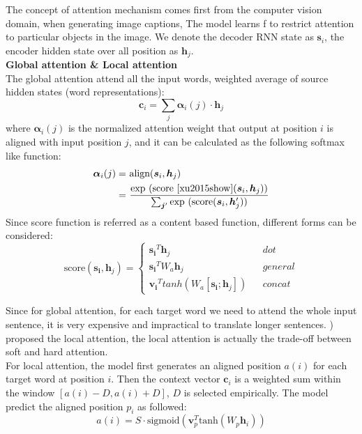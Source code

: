 %
The concept of attention mechanism comes first from the computer vision domain, when generating image captions,  The model learns f to restrict attention to particular objects in the image.
We denote the decoder RNN state as $\bm{s}_i$, the encoder hidden state over all position as $\bm{h}_j$.\\

\textbf{Global attention \& Local attention } \\
The global attention attend all the input words, weighted average of source hidden states (word representations):
\[ \bm{c}_i = \sum_{j} \bm{\alpha}_i(j)\cdot  \bm{h}_j \]
where $\bm{\alpha}_i(j)$ is the normalized attention weight that output at position $i$ is aligned with input position $j$, and it can be calculated as the following softmax like function:
\begin{align}
\bm{\alpha}_i(j) = & \ \text{align}(\bm{s}_i, {\bm{h}}_j) \\
= & \ \frac{\text{exp\ }(\text{score \cite{xu2015show}}(\bm{s}_i, {\bm{h}}_j))}{\sum_{\bm{j}^{\prime}} \text{exp\ }(\text{score}(\bm{s}_i, {\bm{h}}_j^{\prime}))}
\end{align}
Since score function is referred as a content based function, different forms can be considered:
\begin{equation}
\text{score}(\bm{s_i}, {\bm{h}}_j)=\left\{
\begin{array}{lcl}
{\bm{s_i}}^T {\bm{h}}_j & & dot\\
{\bm{s_i}}^T W_a {\bm{h}}_j & & general\\
{\bm{v_i}}^T tanh(W_a[\bm{s_i}; {\bm{h}}_j]) & & concat
\end{array} \right.
\end{equation}



Since for global attention, for each target word we need to attend the whole input sentence, it is very expensive and impractical to translate longer sentences. \cite{luong2015effective}) proposed the local attention, the local attention is actually the  trade-off between soft and hard attention. \\
For local attention, the model first generates an aligned position ${a(i)}$ for each target word at position $i$. Then the context vector ${\bm{c}_i}$ is a weighted sum within the window ${[a(i)-D, a(i)+D]}$, ${D}$ is selected empirically. The model predict the aligned  position ${p_i}$ as followed:
\[ a(i) = S \cdot \text{sigmoid}(\bm{v}_p^T \text{tanh}(W_p \bm{h}_i))\]

